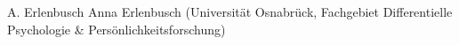
                {A. Erlenbusch}
                {Anna Erlenbusch (Universität Osnabrück, Fachgebiet Differentielle Psychologie \& Persönlichkeitsforschung)}
                